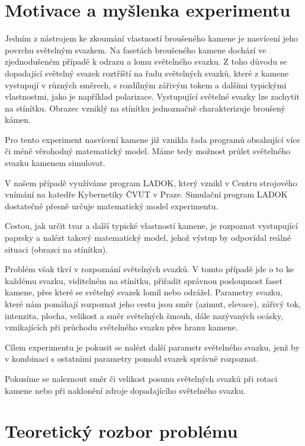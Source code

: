 \section*{Motivace a myšlenka experimentu}

Jedním z nástrojem ke zkoumání vlastností broušeného kamene je nasvícení jeho povrchu světelným svazkem. Na fasetách broušeného kamene dochází ve zjednodušeném případě k odrazu a lomu světelného svazku. Z toho důvodu se dopadající světelný svazek roztříští na řadu světelných svazků, které z kamene vystupují v různých směrech, s rozdílným zářivým tokem a dalšími typickými vlastnostmi, jako je například polarizace. 
Vystupující světelné svazky lze zachytit na stínítku. Obrazec vzniklý na stínítku jednoznačně charakterizuje broušený kámen. 

Pro tento experiment nasvícení kamene již vznikla řada programů obsahující více či méně věrohodný matematický model. Máme tedy možnost průlet světelného svazku kamenem simulovat. 

V našem případě využíváme program LADOK, který vznikl v Centru strojového vnímání na katedře Kybernetiky ČVUT v Praze. Simulační program LADOK dostatečně přesně určuje matematický model experimentu.

Cestou, jak určit tvar a další typické vlastností kamene, je rozpoznat vystupující paprsky a nalézt takový matematický model, jehož výstup by odpovídal reálné situaci (obrazci na stínítku). 

Problém však tkví v rozpoznání světelných svazků. V tomto případě jde o to ke každému svazku, viditelném na stínítku, přiřadit správnou posloupnost faset kamene, přes které se světelný svazek lomil nebo odrážel. Parametry svazku, které nám pomáhají rozpoznat jeho cestu jsou směr (azimut, elevace), zářivý tok, intenzita, plocha, velikost a směr světelných šmouh, dále nazývaných ocásky, vznikajících při průchodu světelného svazku přes hranu kamene. 

Cílem experimentu je pokusit se nalézt další parametr světelného svazku, jenž by v kombinaci s ostatními parametry pomohl svazek správně rozpoznat. 

Pokusíme se naleznout směr či velikost posunu světelných svazků při rotaci kamene nebo při naklonění zdroje dopadajícího světelného svazku. 

\newpage
\section*{Teoretický rozbor problému}

